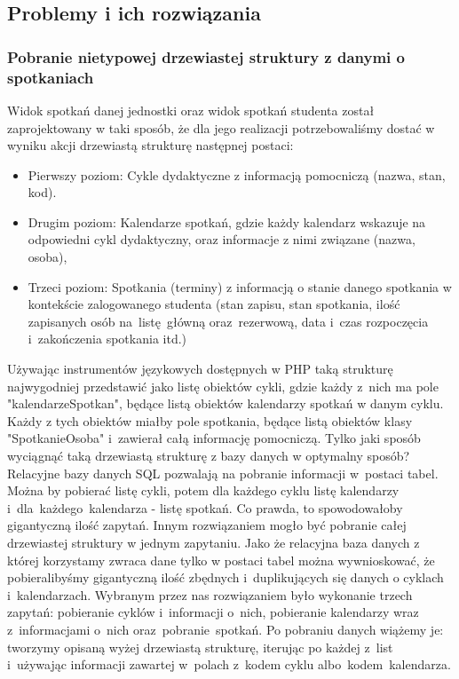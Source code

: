 \documentclass[licencjacka]{pracamgr}
\begin{document}
\subsection{Problemy i ich rozwiązania}
\subsubsection{Pobranie nietypowej drzewiastej struktury z danymi o spotkaniach}
Widok spotkań danej jednostki oraz widok spotkań studenta został zaprojektowany w taki sposób, że dla jego realizacji potrzebowaliśmy dostać w wyniku akcji drzewiastą strukturę następnej postaci:

\begin{itemize}
\item{Pierwszy poziom: Cykle dydaktyczne z informacją pomocniczą (nazwa, stan, kod).}
\item{Drugim poziom: Kalendarze spotkań, gdzie każdy kalendarz wskazuje na odpowiedni cykl dydaktyczny, oraz informacje z nimi związane (nazwa, osoba),}
\item{Trzeci poziom: Spotkania (terminy) z informacją o stanie danego spotkania w kontekście zalogowanego studenta (stan zapisu, stan spotkania, ilość zapisanych osób na~listę~główną oraz~rezerwową, data i~czas rozpoczęcia i~zakończenia spotkania itd.)}
\end{itemize}
Używając instrumentów językowych dostępnych w PHP taką strukturę najwygodniej przedstawić jako listę obiektów cykli, gdzie każdy z~nich ma pole "kalendarzeSpotkan", będące listą obiektów kalendarzy spotkań w danym cyklu. Każdy z tych obiektów miałby pole spotkania, będące listą obiektów klasy "SpotkanieOsoba" i~zawierał całą informację pomocniczą. 
Tylko jaki sposób wyciągnąć taką drzewiastą strukturę z bazy danych w optymalny sposób? Relacyjne bazy danych SQL pozwalają na pobranie informacji w~postaci tabel. Można by pobierać listę cykli, potem dla każdego cyklu listę kalendarzy i~dla~każdego~kalendarza - listę spotkań. Co prawda, to spowodowałoby gigantyczną ilość zapytań. Innym rozwiązaniem mogło być pobranie całej drzewiastej struktury w jednym zapytaniu. Jako że relacyjna baza danych z której korzystamy zwraca dane tylko w postaci tabel można wywnioskować, że pobieralibyśmy gigantyczną ilość zbędnych i~duplikujących się danych o cyklach i~kalendarzach. Wybranym przez nas rozwiązaniem było wykonanie trzech zapytań: pobieranie cyklów i~informacji o~nich, pobieranie kalendarzy wraz z~informacjami o~nich oraz~pobranie~spotkań. Po pobraniu danych wiążemy je: tworzymy opisaną wyżej drzewiastą strukturę, iterując po każdej z~list i~używając informacji zawartej w~polach z~kodem cyklu albo~kodem~kalendarza.
\end{document}
